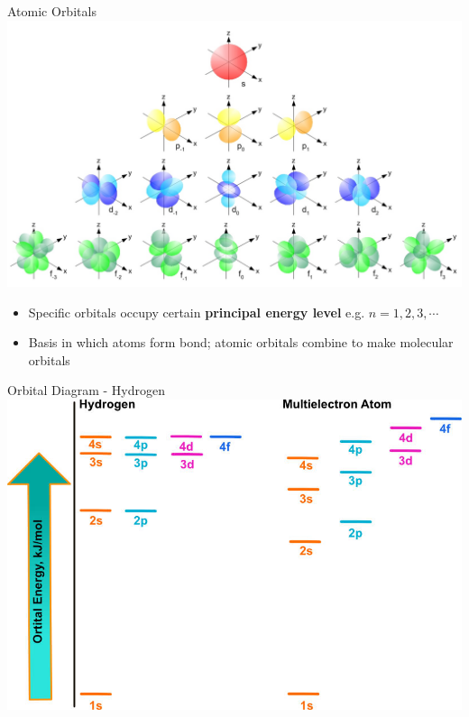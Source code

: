 \documentclass[11pt]{beamer}
\begin{document}
\begin{frame}{Atomic Orbitals}
  \centering
  \includegraphics[width=0.8\linewidth]{single_elect_orb}
  \begin{itemize}
  \item Specific orbitals occupy certain \textbf{principal energy level} e.g.
    $n = 1, 2, 3, \cdots$
  \item Basis in which atoms form bond; atomic orbitals combine to make
    molecular orbitals
  \end{itemize}
\end{frame}

\begin{frame}{Orbital Diagram - Hydrogen}
  \centering
  \includegraphics[scale=1.5,trim={0 0 1.2in 0},clip]{orbital_energy}
\end{frame}
\end{document}
